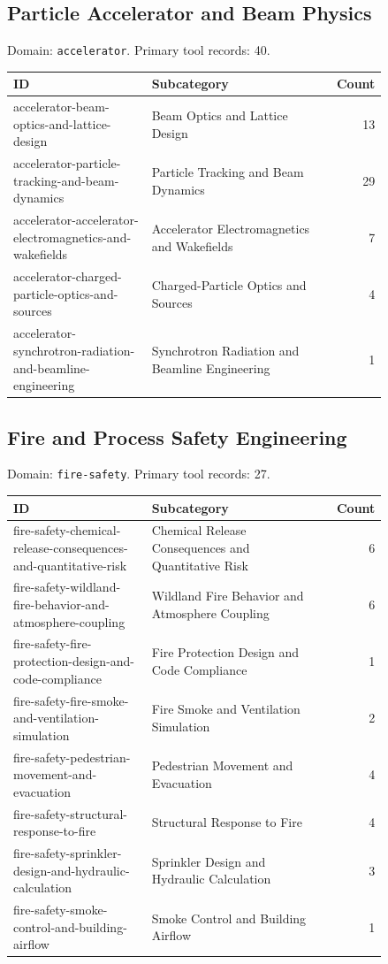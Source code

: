 \subsection{Particle Accelerator and Beam Physics}
\noindent Domain: \texttt{accelerator}. Primary tool records: 40.
\begin{longtable}{p{0.37\linewidth}p{0.47\linewidth}r}
ID & Subcategory & Count\\\hline\endhead
accelerator-beam-optics-and-lattice-design & Beam Optics and Lattice Design & 13\\
accelerator-particle-tracking-and-beam-dynamics & Particle Tracking and Beam Dynamics & 29\\
accelerator-accelerator-electromagnetics-and-wakefields & Accelerator Electromagnetics and Wakefields & 7\\
accelerator-charged-particle-optics-and-sources & Charged-Particle Optics and Sources & 4\\
accelerator-synchrotron-radiation-and-beamline-engineering & Synchrotron Radiation and Beamline Engineering & 1\\
\end{longtable}
\subsection{Fire and Process Safety Engineering}
\noindent Domain: \texttt{fire-safety}. Primary tool records: 27.
\begin{longtable}{p{0.37\linewidth}p{0.47\linewidth}r}
ID & Subcategory & Count\\\hline\endhead
fire-safety-chemical-release-consequences-and-quantitative-risk & Chemical Release Consequences and Quantitative Risk & 6\\
fire-safety-wildland-fire-behavior-and-atmosphere-coupling & Wildland Fire Behavior and Atmosphere Coupling & 6\\
fire-safety-fire-protection-design-and-code-compliance & Fire Protection Design and Code Compliance & 1\\
fire-safety-fire-smoke-and-ventilation-simulation & Fire Smoke and Ventilation Simulation & 2\\
fire-safety-pedestrian-movement-and-evacuation & Pedestrian Movement and Evacuation & 4\\
fire-safety-structural-response-to-fire & Structural Response to Fire & 4\\
fire-safety-sprinkler-design-and-hydraulic-calculation & Sprinkler Design and Hydraulic Calculation & 3\\
fire-safety-smoke-control-and-building-airflow & Smoke Control and Building Airflow & 1\\
\end{longtable}
